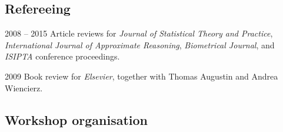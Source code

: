 \documentclass[a4paper]{simplecv}
\begin{document}
\subsection{Refereeing}
\begin{topic}
\item[2008 -- 2015] Article reviews for
\emph{Journal of Statistical Theory and Practice},
\emph{International Journal of Approximate Reasoning},
\emph{Biometrical Journal}, and
\emph{ISIPTA} conference proceedings.

\item[2009] Book review for \emph{Elsevier}, together with Thomas Augustin and Andrea Wiencierz.
\end{topic}

\subsection{Workshop organisation}

\end{document}
